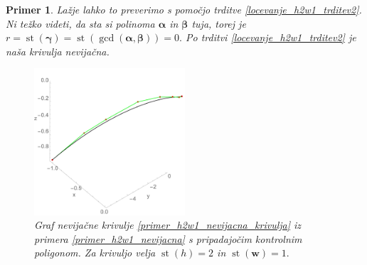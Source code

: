 \documentclass[12pt,a4paper,twoside]{article}
\theoremstyle{definition} %
\theoremstyle{plain} %
\theoremstyle{primerstyle}
\newtheorem{primer}[definicija]{Primer}
\numberwithin{equation}{section}  %
\newcommand{\wV}{\mathbf{w}}
\newcommand{\balpha}{\boldsymbol \alpha}
\newcommand{\bbeta}{\boldsymbol \beta}
\newcommand{\bgamma}{\boldsymbol \gamma}
\DeclareMathOperator{\st}{st}
\begin{document}
\begin{primer}
	Lažje lahko to preverimo s pomočjo trditve \ref{locevanje_h2w1_trditev2}. Ni težko videti, da sta si polinoma $\balpha$ in $\bbeta$ tuja, torej je $r=\st(\bgamma)=\st(\gcd(\balpha,\bbeta))=0.$ Po trditvi \ref{locevanje_h2w1_trditev2} je naša krivulja nevijačna.
	\begin{figure}[h]
	  \centering
	  \includegraphics[width=0.5\textwidth]{images/h2w1_nevijacna.pdf}
	  \caption[Primer nevijačne krivulje ($\st(h)=2,$ $\st(\wV)=1$)]{Graf nevijačne krivulje \eqref{primer_h2w1_nevijacna_krivulja} iz primera \ref{primer_h2w1_nevijacna} s pripadajočim kontrolnim poligonom. Za krivuljo velja $\st(h)=2$ in $\st(\wV)=1.$}
	  \label{fig:h2w1_nevijacna}
	\end{figure}
\end{primer}
\end{document}
